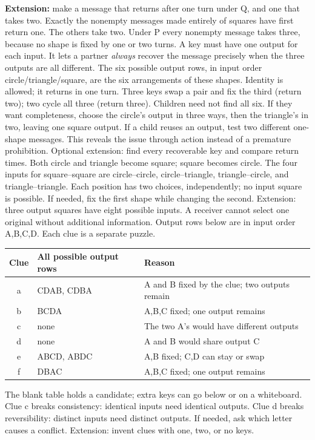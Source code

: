 \documentclass[11pt]{article}
\begin{document}
\textbf{Extension:} make a message that returns after one turn under Q, and one that takes two. Exactly the nonempty messages made entirely of squares have first return one. The others take two. Under P every nonempty message takes three, because no shape is fixed by one or two turns.
A key must have one output for each input. It lets a partner \emph{always} recover the message precisely when the three outputs are all different. The six possible output rows, in input order circle/triangle/square, are the six arrangements of these shapes. Identity is allowed; it returns in one turn. Three keys swap a pair and fix the third (return two); two cycle all three (return three).
Children need not find all six. If they want completeness, choose the circle's output in three ways, then the triangle's in two, leaving one square output. If a child reuses an output, test two different one-shape messages. This reveals the issue through action instead of a premature prohibition. Optional extension: find every recoverable key and compare return times.
Both circle and triangle become square; square becomes circle. The four inputs for square--square are circle--circle, circle--triangle, triangle--circle, and triangle--triangle. Each position has two choices, independently; no input square is possible. If needed, fix the first shape while changing the second. Extension: three output squares have eight possible inputs. A receiver cannot select one original without additional information.
\newpage
{}
Output rows below are in input order A,B,C,D. Each clue is a separate puzzle.
\begin{center}\renewcommand{\arraystretch}{1.2}\begin{tabular}{c|l|l}Clue&All possible output rows&Reason\\\hline a&CDAB, CDBA&A and B fixed by the clue; two outputs remain\\ b&BCDA&A,B,C fixed; one output remains\\ c&none&The two A's would have different outputs\\ d&none&A and B would share output C\\ e&ABCD, ABDC&A,B fixed; C,D can stay or swap\\ f&DBAC&A,B,C fixed; one output remains\end{tabular}\end{center}
The blank table holds a candidate; extra keys can go below or on a whiteboard. Clue c breaks consistency: identical inputs need identical outputs. Clue d breaks reversibility: distinct inputs need distinct outputs. If needed, ask which letter causes a conflict. Extension: invent clues with one, two, or no keys.
\end{document}
